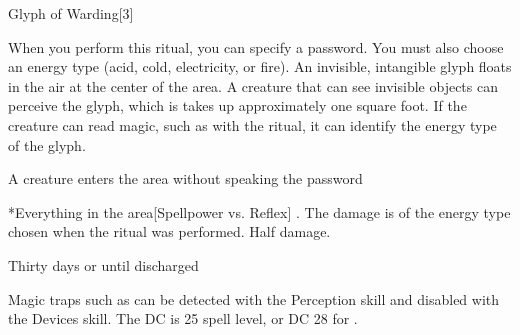 \begin{spellsection}{Glyph of Warding}[3]
    \begin{spellheader}
    \end{spellheader}
    \begin{spellcontent}
        \begin{spelltargetinginfo}
        \end{spelltargetinginfo}
        \begin{spelleffects}
            \spellspecial When you perform this ritual, you can specify a password. You must also choose an energy type (acid, cold, electricity, or fire).
            \spelleffect An invisible, intangible glyph floats in the air at the center of the area. A creature that can see invisible objects can perceive the glyph, which is takes up approximately one square foot. If the creature can read magic, such as with the  ritual, it can identify the energy type of the glyph.
            \begin{spelltrigger}{A creature enters the area without speaking the password}
                \begin{spelltargets}*{Everything in the area}[Spellpower vs. Reflex]
                    \spellsuccess \spelldamage[d8]. The damage is of the energy type chosen when the ritual was performed.
                    \spellfailure Half damage.
                \end{spelltargets}
            \end{spelltrigger}
            \spelldur Thirty days or until discharged
        \end{spelleffects}
    \end{spellcontent}
    \begin{spellfooter}
        \spellnotes Magic traps such as  can be detected with the Perception skill and disabled with the Devices skill. The DC is 25 \add spell level, or DC 28 for .
    \end{spellfooter}
\end{spellsection}

